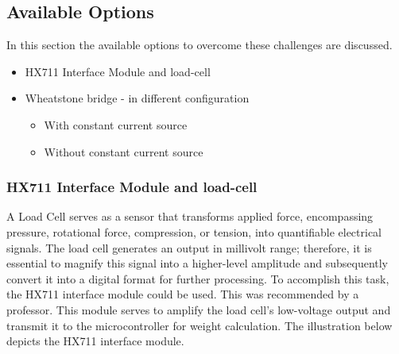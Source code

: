 \documentclass[../report.tex]{subfiles}
\begin{document}
\subsection{Available Options}

In this section the available options to overcome these challenges are discussed.

\begin{itemize}

  \item HX711 Interface Module and load-cell
  \item Wheatstone bridge - in different configuration
  \begin{itemize}
    \item With constant current source
    \item Without constant current source
  \end{itemize}

\end{itemize}

\subsubsection{HX711 Interface Module and load-cell}

A Load Cell serves as a sensor that transforms applied force, encompassing pressure, rotational force, compression, or tension, into quantifiable electrical signals.
The load cell generates an output in millivolt range; therefore, it is essential to magnify this signal into a higher-level amplitude and subsequently convert it into a digital format for further processing.
To accomplish this task, the HX711 interface module could be used. This was recommended by a professor. This module serves to amplify the load cell's low-voltage output and transmit it to the microcontroller for weight calculation. 
The illustration below depicts the HX711 interface module.
\end{document}
